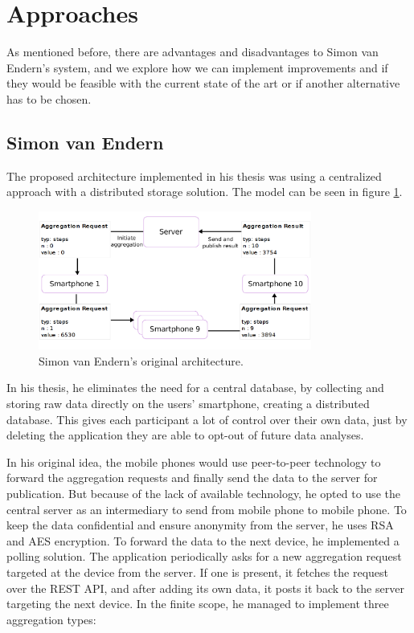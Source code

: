 \section{Approaches}
As mentioned before, there are advantages and disadvantages to Simon van Endern's system, and we explore how we can implement improvements and if they would be feasible with the current state of the art or if another alternative has to be chosen.

\subsection{Simon van Endern}
The proposed architecture implemented in his thesis was using a centralized approach with a distributed storage solution. The model can be seen in figure \ref{fig:simon_original}.

\begin{figure}[htpb]
  \centering
  \includegraphics[width=0.8\textwidth]{figures/simon_original.png}
  \caption{Simon van Endern's original architecture.} \label{fig:simon_original}
\end{figure}

In his thesis, he eliminates the need for a central database, by collecting and storing raw data directly on the users' smartphone, creating a distributed database. This gives each participant a lot of control over their own data, just by deleting the application they are able to opt-out of future data analyses.

In his original idea, the mobile phones would use peer-to-peer technology to forward the aggregation requests and finally send the data to the server for publication. But because of the lack of available technology, he opted to use the central server as an intermediary to send from mobile phone to mobile phone. To keep the data confidential and ensure anonymity from the server, he uses RSA and AES encryption. To forward the data to the next device, he implemented a polling solution. The application periodically asks for a new aggregation request targeted at the device from the server. If one is present, it fetches the request over the REST API, and after adding its own data, it posts it back to the server targeting the next device.
In the finite scope, he managed to implement three aggregation types:

